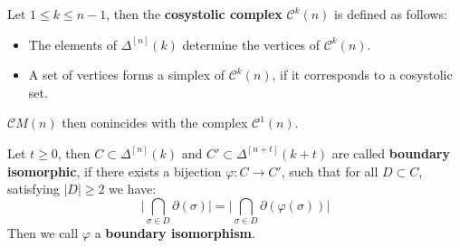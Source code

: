\begin{defi}\label{definition2}
Let \(1\leq k\leq n-1\), then the \textbf{cosystolic complex} \(\mathcal{C}^k(n)\) is defined as follows:
\begin{itemize}
\item The elements of \(\Delta^{[n]}(k)\) determine the vertices of \(\mathcal{C}^k(n)\).
\item A set of vertices forms a simplex of \(\mathcal{C}^k(n)\), if it corresponds to a cosystolic set.
\end{itemize}
\(\mathcal{C}M(n)\) then conincides with the complex \(\mathcal{C}^1(n)\).
\end{defi}

\begin{defi}
Let \(t\geq 0\), then \(C\subset\Delta^{[n]}(k)\) and \(C'\subset\Delta^{[n+t]}(k+t)\) are called \textbf{boundary isomorphic}, if there exists a bijection \(\varphi:C\rightarrow C'\), such that for all \(D\subset C\), satisfying \(|D|\geq 2\) we have:
\[
\bigg\vert\bigcap\limits_{\sigma\in D}\partial(\sigma)\bigg\vert=\bigg\vert\bigcap\limits_{\sigma\in D}\partial(\varphi(\sigma))\bigg\vert
\]
Then we call \(\varphi\) a \textbf{boundary isomorphism}.
\end{defi}

